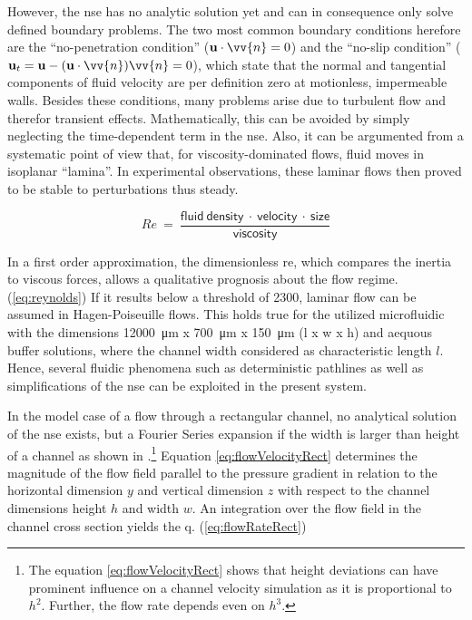 However, the \gls{nse} has no analytic solution yet and can in consequence only solve defined boundary problems. The two most common boundary conditions herefore are the ``no-penetration condition'' ($\mathbf{u} \cdot \vv{n} = 0$) and the ``no-slip condition'' ($\mathbf{u}_t = \mathbf{u} - (\mathbf{u}\cdot \vv{n}) \vv{n} = 0$), which state that the normal and tangential components of fluid velocity are per definition zero at motionless, impermeable walls.\newline
Besides these conditions, many problems arise due to turbulent flow and therefor transient effects. Mathematically, this can be avoided by simply neglecting the time-dependent term in the \gls{nse}. Also, it can be argumented from a systematic point of view that, for viscosity-dominated flows, fluid moves in isoplanar ``lamina''. In experimental observations, these laminar flows then proved to be stable to perturbations thus steady.

\begin{equation}
	\mathit{Re}\ =\ \frac{\mathrm{\mathsf{fluid\ density\ \cdot\ velocity\ \cdot\ size}}}{\mathrm{\mathsf{viscosity}}} \label{eq:reynolds}
\end{equation}

In a first order approximation, the dimensionless \gls{re}, which compares the inertia to viscous forces, allows a qualitative prognosis about the flow regime. (\cref{eq:reynolds}) If it results below a threshold of 2300, laminar flow can be assumed in Hagen-Poiseuille flows. This holds true for the utilized microfluidic with the dimensions \SI{12000}{\micro\meter} x \SI{700}{\micro\meter} x \SI{150}{\micro\meter} (l x w x h) and aequous buffer solutions, where the channel width considered as characteristic length $l$. Hence, several fluidic phenomena such as deterministic pathlines as well as simplifications of the \gls{nse} can be exploited in the present system. 

In the model case of a flow through a rectangular channel, no analytical solution of the \gls{nse} exists, but a Fourier Series expansion if the width is larger than height of a channel as shown in \citet{lit:fluidic:bruus}.\footnote{The equation \cref{eq:flowVelocityRect} shows that height deviations can have prominent influence on a channel velocity simulation as it is proportional to $h^2$. Further, the flow rate depends even on $h^3$.} 
Equation \cref{eq:flowVelocityRect} determines the magnitude of the flow field parallel to the pressure gradient in relation to the horizontal dimension $y$ and vertical dimension $z$ with respect to the channel dimensions height $h$ and width $w$. An integration over the flow field in the channel cross section yields the \gls{q}. (\cref{eq:flowRateRect})

